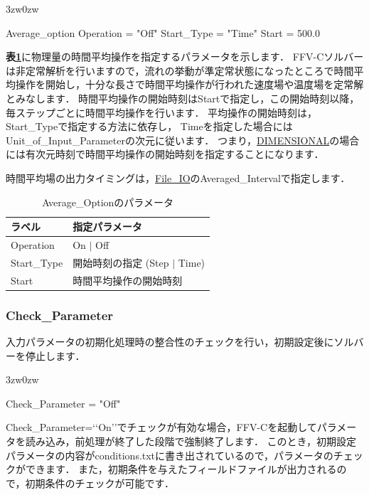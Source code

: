 \begin{indentation}{3zw}{0zw}

{\small
\begin{program}
  Average_option {
    Operation  = "Off"
    Start_Type = "Time"
    Start      = 500.0
  }
\end{program}
}

\textbf{表\ref{tbl:averaging}}に物理量の時間平均操作を指定するパラメータを示します．
FFV-Cソルバーは非定常解析を行いますので，流れの挙動が準定常状態になったところで時間平均操作を開始し，十分な長さで時間平均操作が行われた速度場や温度場を定常解とみなします．
時間平均操作の開始時刻はStartで指定し，この開始時刻以降，毎ステップごとに時間平均操作を行います．
平均操作の開始時刻は，Start\_Typeで指定する方法に依存し，
Timeを指定した場合にはUnit\_of\_Input\_Parameterの次元に従います．
つまり，\hyperlink{tgt:unit}{DIMENSIONAL}の場合には有次元時刻で時間平均操作の開始時刻を指定することになります．

時間平均場の出力タイミングは，\hyperlink{tgt:fileio}{File\_IO}のAveraged\_Intervalで指定します．


\begin{table}[htdp]
\caption{Average\_Optionのパラメータ}
\begin{center}
\small
\begin{tabular}{ll} \toprule
ラベル & 指定パラメータ\\ \midrule
Operation & On $|$ Off\\
Start\_Type & 開始時刻の指定 (Step $|$ Time)\\
Start & 時間平均操作の開始時刻\\ \bottomrule
\end{tabular}
\end{center}
\label{tbl:averaging}
\end{table}

\end{indentation}



\pagebreak
\subsubsection{Check\_Parameter}

入力パラメータの初期化処理時の\hypertarget{tgt:check_parameter}{整合性のチェック}を行い，初期設定後にソルバーを停止します．

\begin{indentation}{3zw}{0zw}

{\small
\begin{program}
  Check_Parameter = "Off"
\end{program}
}

Check\_Parameter=\lq\lq On\rq\rq でチェックが有効な場合，FFV-Cを起動してパラメータを読み込み，前処理が終了した段階で強制終了します．
このとき，初期設定パラメータの内容がconditions.txtに書き出されているので，パラメータのチェックができます．
また，初期条件を与えたフィールドファイルが出力されるので，初期条件のチェックが可能です．

\end{indentation}



